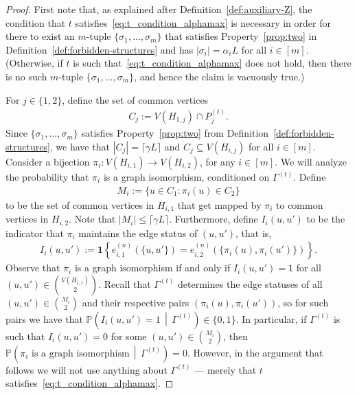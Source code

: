 \documentclass[11pt]{article}
\theoremstyle{plain}
\theoremstyle{definition}
\theoremstyle{remark}
\renewcommand{\Pr}{\mathbb{P}}
\begin{document}
\begin{proof}
    First note that, as explained after Definition~\ref{def:auxiliary-Z}, the condition that $t$ satisfies~\eqref{eq:t_condition_alphamax} is necessary in order for there to exist an $m$-tuple $\{\sigma_1, \dots, \sigma_m\}$ that satisfies 
    Property~\ref{prop:two} in Definition~\ref{def:forbidden-structures} 
    and has $|\sigma_i| = \alpha_iL$ for all $i \in [m]$. 
    (Otherwise, if $t$ is such that~\eqref{eq:t_condition_alphamax} does not hold, then there is no such $m$-tuple $\{\sigma_1, \dots, \sigma_m\}$, and hence the claim is vacuously true.)

    For $j \in \{1,2\}$, define the set of common vertices
    \begin{align*}
        C_j := V(H_{1,j}) \cap P_j^{(t)}.
    \end{align*}
    Since $\{\sigma_1, \dots, \sigma_m\}$ satisfies Property~\ref{prop:two} from Definition~\ref{def:forbidden-structures}, we have that $|C_j| = \lceil \gamma L \rceil$ and $C_j \subseteq V(H_{i,j})$ for all $i \in [m]$. Consider a bijection $\pi_i: V(H_{i,1}) \to V(H_{i,2})$, for any $i \in [m]$. We will analyze the probability that $\pi_i$ is a graph isomorphism, conditioned on $\Gamma^{(t)}$. Define
    \begin{align*}
        M_i := \{u \in C_1: \pi_i(u) \in C_2\}
    \end{align*}
    to be the set of common vertices in $H_{i,1}$ that get mapped by $\pi_i$ to common vertices in $H_{i,2}$. Note that $|M_i| \leq \lceil \gamma L\rceil$. Furthermore, define $I_{i}(u,u')$ to be the indicator that $\pi_i$ maintains the edge status of $(u, u')$, that is,
    \begin{align*}
        I_{i}(u,u') := \mathbf{1}{\left\{e_{i,1}^{(n)}(\{u,u'\}) = e_{i,2}^{(n)}(\{\pi_i(u), \pi_i(u')\}) \right\}}.
    \end{align*}
    Observe that $\pi_{i}$ is a graph isomorphism if and only if $I_{i}(u,u') = 1$ for all $(u,u') \in \binom{V(H_{i,1})}{2}$.     
    Recall that $\Gamma^{(t)}$ determines the edge statuses of all $(u,u') \in \binom{M_{i}}{2}$ and their respective pairs $(\pi_i(u), \pi_i(u'))$, so for such pairs we have that $\Pr\left(I_{i}(u, u') = 1 \, \middle| \, \Gamma^{(t)}\right) \in \{0,1\}$. 
    In particular, if $\Gamma^{(t)}$ is such that $I_{i}(u,u') = 0$ for some $(u,u') \in \binom{M_{i}}{2}$, 
    then 
    $\Pr\left(\pi_i \text{ is a graph isomorphism} \, \middle| \, \Gamma^{(t)}\right) = 0$. 
    However, in the argument that follows we will not use anything about $\Gamma^{(t)}$ --- merely that $t$ satisfies~\eqref{eq:t_condition_alphamax}. 

\end{proof}
\end{document}

